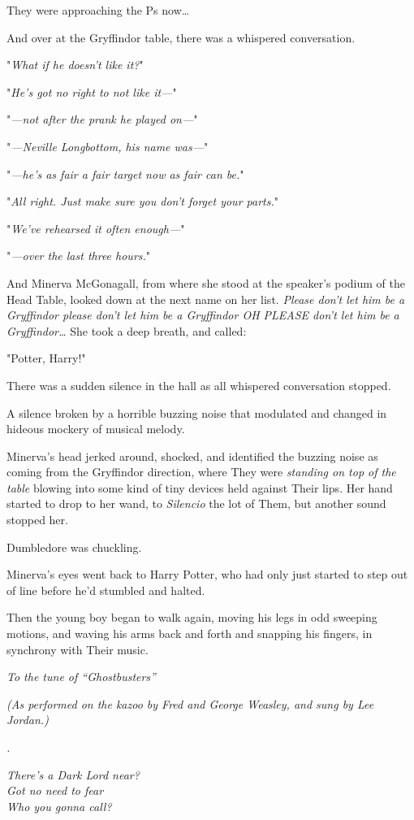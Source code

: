 They were approaching the Ps now{\ldots}

And over at the Gryffindor table, there was a whispered conversation.

"\emph{What if he doesn't like it?}"

"\emph{He's got no right to not like it---}"

"\emph{---not after the prank he played on---}"

"\emph{---Neville Longbottom, his name was---}"

"\emph{---he's as fair a fair target now as fair can be.}"

"\emph{All right. Just make sure you don't forget your parts.}"

"\emph{We've rehearsed it often enough---}"

"\emph{---over the last three hours.}"

And Minerva McGonagall, from where she stood at the speaker's podium of the 
Head Table, looked down at the next name on her list. \emph{Please don't let 
him be a Gryffindor please don't let him be a Gryffindor OH PLEASE don't let 
him be a Gryffindor{\ldots}} She took a deep breath, and called:

"Potter, Harry!"

There was a sudden silence in the hall as all whispered conversation stopped.

A silence broken by a horrible buzzing noise that modulated and changed in 
hideous mockery of musical melody.

Minerva's head jerked around, shocked, and identified the buzzing noise as 
coming from the Gryffindor direction, where They were \emph{standing on top of 
the table} blowing into some kind of tiny devices held against Their lips. Her 
hand started to drop to her wand, to \emph{Silencio} the lot of Them, but 
another sound stopped her.

Dumbledore was chuckling.

Minerva's eyes went back to Harry Potter, who had only just started to step out 
of line before he'd stumbled and halted.

Then the young boy began to walk again, moving his legs in odd sweeping 
motions, and waving his arms back and forth and snapping his fingers, in 
synchrony with Their music.

\begin{center}
\emph{To the tune of ``Ghostbusters''}

\emph{(As performed on the kazoo by Fred and George Weasley,
and sung by Lee Jordan.)}

\emph{.}

\emph{There's a Dark Lord near?\\
Got no need to fear\\
Who you gonna call?}
\end{center}

